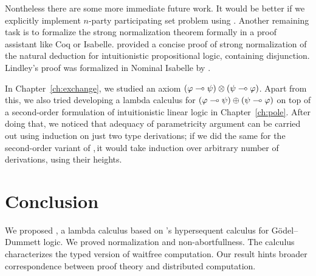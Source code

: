 Nontheless there are some more immediate future work.
It would be better if we explicitly implement $n$-party participating
set problem using \lgd.
Another remaining task is to formalize the strong normalization theorem
formally in a proof assistant like Coq or Isabelle.
\citet{ttlifting} provided a concise proof of strong normalization of
the natural deduction for
intuitionistic propositional logic, containing disjunction.
Lindley's proof was formalized in Nominal Isabelle by
\citet{Doczkal2009}.

In Chapter~\ref{ch:exchange}, we studied an axiom
$(\varphi\multimap\psi)\otimes(\psi\multimap\varphi)$.
Apart from this, we also tried developing a lambda calculus for
$(\varphi\multimap\psi)\oplus(\psi\multimap\varphi)$ on top of a second-order
formulation of intuitionistic linear logic in Chapter~\ref{ch:pole}.
After doing that, we noticed that adequacy of parametricity argument
can be carried out using induction on just two type derivations;
if we did the same for the second-order variant of \lgd,\,it would take
induction over arbitrary number of derivations, using their heights.

\section{Conclusion}
\label{conc}
We proposed \lgd, a lambda calculus
based on \citet{avron91}'s hypersequent calculus for
G\"odel--Dummett logic.
We proved normalization and non-abortfullness.
The calculus characterizes
the typed version of waitfree computation.
Our result hints broader correspondence between proof theory and distributed computation.

\renewcommand{\comodL}{\comod{c}{\co c}}
\renewcommand{\comodR}{\comod{\co c}{c}}
